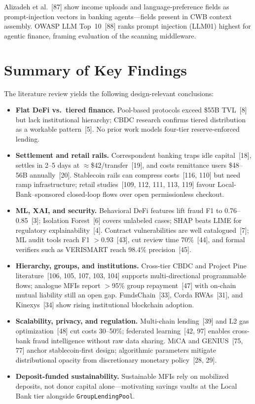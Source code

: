 \documentclass[12pt, a4paper]{report}
\begin{document}
Alizadeh et al.~[87] show income uploads and language-preference fields as prompt-injection vectors in banking agents---fields present in CWB context assembly. OWASP LLM Top~10~[88] ranks prompt injection (LLM01) highest for agentic finance, framing evaluation of the scanning middleware.

\section{Summary of Key Findings}
\label{sec:lit-key-findings}

The literature review yields the following design-relevant conclusions:

\begin{itemize}[noitemsep]
\item \textbf{Flat DeFi vs.\ tiered finance.} Pool-based protocols exceed \$55B TVL~[8] but lack institutional hierarchy; CBDC research confirms tiered distribution as a workable pattern~[5]. No prior work models four-tier reserve-enforced lending.
\item \textbf{Settlement and retail rails.} Correspondent banking traps idle capital~[18], settles in 2--5 days at $\approx$\$42/transfer~[19], and costs remittance users \$48--56B annually~[20]. Stablecoin rails can compress costs~[116, 110] but need ramp infrastructure; retail studies~[109, 112, 111, 113, 119] favour Local-Bank--sponsored closed-loop flows over open permissionless checkout.
\item \textbf{ML, XAI, and security.} Behavioral DeFi features lift fraud F1 to 0.76--0.85~[3]; Isolation Forest~[6] covers unlabeled cases; SHAP beats LIME for regulatory explainability~[4]. Contract vulnerabilities are well catalogued~[7]; ML audit tools reach F1 $>$0.93~[43], cut review time 70\%~[44], and formal verifiers such as VERISMART reach 98.4\% precision~[45].
\item \textbf{Hierarchy, groups, and institutions.} Cross-tier CBDC and Project Pine literature~[106, 105, 107, 103, 104] supports multi-directional programmable flows; analogue MFIs report $>$95\% group repayment~[47] with on-chain mutual liability still an open gap. FundsChain~[33], Corda RWAs~[31], and Kinexys~[34] show rising institutional blockchain adoption.
\item \textbf{Scalability, privacy, and regulation.} Multi-chain lending~[39] and L2 gas optimization~[48] cut costs 30--50\%; federated learning~[42, 97] enables cross-bank fraud intelligence without raw data sharing. MiCA and GENIUS~[75, 77] anchor stablecoin-first design; algorithmic parameters mitigate distributional opacity from discretionary monetary policy~[28, 29].
\item \textbf{Deposit-funded sustainability.} Sustainable MFIs rely on mobilized deposits, not donor capital alone---motivating savings vaults at the Local Bank tier alongside \texttt{GroupLendingPool}.
\end{itemize}
\end{document}
